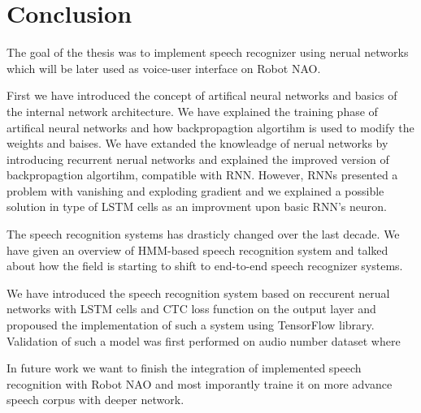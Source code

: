 \chapter{Conclusion}

The goal of the thesis was to implement speech recognizer using nerual networks which will be later used as voice-user interface on Robot NAO.

First we have introduced the concept of artifical neural networks and basics of the internal network architecture.
We have explained the training phase of artifical neural networks and how backpropagtion algortihm is used to modify the weights and baises.
We have extanded the knowleadge of nerual networks by introducing recurrent nerual networks and explained the improved version of backpropagtion algortihm, compatible with RNN.
However, RNNs presented a problem with vanishing and exploding gradient and we explained a possible solution in type of LSTM cells as an improvment upon basic RNN's neuron.

The speech recognition systems has drasticly changed over the last decade.
We have given an overview of HMM-based speech recognition system and talked about how the field is starting to shift to end-to-end speech recognizer systems.

We have introduced the speech recognition system based on reccurent nerual networks with LSTM cells and CTC loss function on the output layer and propoused the implementation of such a system using TensorFlow library.
Validation of such a model was first performed on audio number dataset where

In future work we want to finish the integration of implemented speech recognition with Robot NAO and most imporantly traine it on more advance speech corpus with deeper network.
